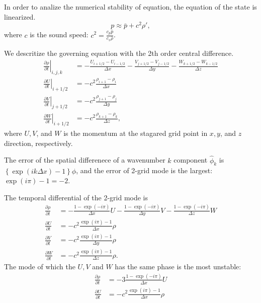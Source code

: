 In order to analize the numerical stability of equation, the equation of the state is linearized.
\begin{equation}
  p \approx \bar{p} + c^2 \rho',
\end{equation}
where $c$ is the sound speed: $c^2=\frac{c_p\bar{p}}{c_v\bar{\rho}}$.


We descritize the governing equation with the 2th order central difference.
\begin{align}
  \left. \frac{\partial \rho}{\partial t}\right|_{i,j,k} &=
  -\frac{U_{i+1/2}-U_{i-1/2}}{\Delta x}
  -\frac{V_{j+1/2}-V_{j-1/2}}{\Delta y}
  -\frac{W_{k+1/2}-W_{k-1/2}}{\Delta z} \\
  \left. \frac{\partial U}{\partial t}\right|_{i+1/2} &=
  -c^2\frac{\rho_{i+1}-\rho_i}{\Delta x} \\
  \left. \frac{\partial V}{\partial t}\right|_{j+1/2} &=
  -c^2\frac{\rho_{j+1}-\rho_j}{\Delta y} \\
  \left. \frac{\partial W}{\partial t}\right|_{i+1/2} &=
  -c^2\frac{\rho_{k+1}-\rho_k}{\Delta z},
\end{align}
where $U, V$, and $W$ is the momentum at the stagared grid point in $x, y$, and $z$ direction, respectively.

The error of the spatial differenece of a wavenumber $k$ component $\hat{\phi}_k$ is $\left\{\exp(ik\Delta x)-1\right\}\hat{\phi}$, and the error of 2-grid mode is the largest: $\exp(i\pi)-1 = -2$.

The temporal differential of the 2-grid mode is
\begin{align}
  \frac{\partial \rho}{\partial t} &=
  -\frac{1-\exp(-i\pi)}{\Delta x}U
  -\frac{1-\exp(-i\pi)}{\Delta y}V
  -\frac{1-\exp(-i\pi)}{\Delta z}W \\
  \frac{\partial U}{\partial t} &=
  -c^2\frac{\exp(i\pi)-1}{\Delta x}\rho \\
  \frac{\partial V}{\partial t} &=
  -c^2\frac{\exp(i\pi)-1}{\Delta y}\rho \\
  \frac{\partial W}{\partial t} &=
  -c^2\frac{\exp(i\pi)-1}{\Delta z}\rho.
\end{align}
The mode of which the $U, V$ and $W$ has the same phase is the most unstable:
\begin{align}
  \frac{\partial \rho}{\partial t} &=
  -3\frac{1-\exp(-i\pi)}{\Delta x}U \\
  \frac{\partial U}{\partial t} &=
  -c^2\frac{\exp(i\pi)-1}{\Delta x}\rho
\end{align}

